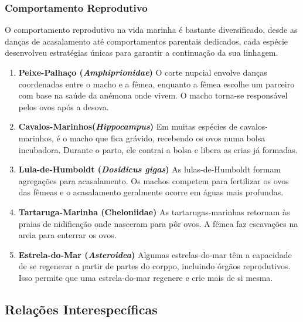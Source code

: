 \documentclass{report}
\begin{document}
\subsubsection{Comportamento Reprodutivo}
O comportamento reprodutivo na vida marinha é bastante diversificado, desde as danças de acasalamento até comportamentos parentais dedicados, cada espécie desenvolveu estratégias únicas para garantir a continuação da sua linhagem.
\begin{enumerate}
	\item \textbf{Peixe-Palhaço (\textit{Amphiprionidae})}
	O corte nupcial envolve danças coordenadas entre o macho e a fêmea, enquanto a fêmea escolhe um parceiro com base na saúde da anémona onde vivem. O macho torna-se responsável pelos ovos após a desova.
	\item \textbf{Cavalos-Marinhos(\textit{Hippocampus})}
	Em muitas espécies de cavalos-marinhos, é o macho que fica grávido, recebendo os ovos numa bolsa incubadora. Durante o parto, ele contrai a bolsa e libera as crias já formadas.
	\item \textbf{Lula-de-Humboldt (\textit{Dosidicus gigas})}
	As lulas-de-Humboldt formam agregações para acasalamento. Os machos competem para fertilizar os ovos das fêmeas e o acasalamento geralmente ocorre em águas mais profundas.
	\item \textbf{Tartaruga-Marinha (Cheloniidae)}
	As tartarugas-marinhas retornam às praias de nidificação onde nasceram para pôr ovos. A fêmea faz escavações na areia para enterrar os ovos.
	\item \textbf{Estrela-do-Mar (\textit{Asteroidea})}
	Algumas estrelas-do-mar têm a capacidade de se regenerar a partir de partes do corppo, incluindo órgãos reprodutivos. Isso permite que uma estrela-do-mar regenere e crie mais de si mesma.
\end{enumerate}	

\subsection{Relações Interespecíficas}
\end{document}
